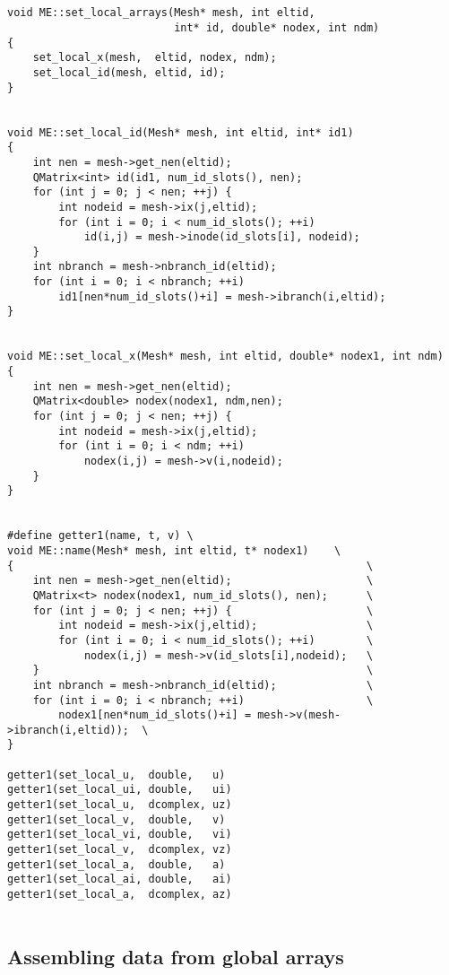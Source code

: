 \begin{verbatim}


void ME::set_local_arrays(Mesh* mesh, int eltid,
                          int* id, double* nodex, int ndm)
{
    set_local_x(mesh,  eltid, nodex, ndm);
    set_local_id(mesh, eltid, id);
}


void ME::set_local_id(Mesh* mesh, int eltid, int* id1)
{
    int nen = mesh->get_nen(eltid);
    QMatrix<int> id(id1, num_id_slots(), nen);
    for (int j = 0; j < nen; ++j) {
        int nodeid = mesh->ix(j,eltid);
        for (int i = 0; i < num_id_slots(); ++i)
            id(i,j) = mesh->inode(id_slots[i], nodeid);
    }
    int nbranch = mesh->nbranch_id(eltid);
    for (int i = 0; i < nbranch; ++i)
        id1[nen*num_id_slots()+i] = mesh->ibranch(i,eltid);
}


void ME::set_local_x(Mesh* mesh, int eltid, double* nodex1, int ndm)
{
    int nen = mesh->get_nen(eltid);
    QMatrix<double> nodex(nodex1, ndm,nen);
    for (int j = 0; j < nen; ++j) {
        int nodeid = mesh->ix(j,eltid);
        for (int i = 0; i < ndm; ++i)
            nodex(i,j) = mesh->v(i,nodeid);
    }
}


#define getter1(name, t, v) \
void ME::name(Mesh* mesh, int eltid, t* nodex1)    \
{                                                       \
    int nen = mesh->get_nen(eltid);                     \
    QMatrix<t> nodex(nodex1, num_id_slots(), nen);      \
    for (int j = 0; j < nen; ++j) {                     \
        int nodeid = mesh->ix(j,eltid);                 \
        for (int i = 0; i < num_id_slots(); ++i)        \
            nodex(i,j) = mesh->v(id_slots[i],nodeid);   \
    }                                                   \
    int nbranch = mesh->nbranch_id(eltid);              \
    for (int i = 0; i < nbranch; ++i)                   \
        nodex1[nen*num_id_slots()+i] = mesh->v(mesh->ibranch(i,eltid));  \
}

getter1(set_local_u,  double,   u)
getter1(set_local_ui, double,   ui)
getter1(set_local_u,  dcomplex, uz)
getter1(set_local_v,  double,   v)
getter1(set_local_vi, double,   vi)
getter1(set_local_v,  dcomplex, vz)
getter1(set_local_a,  double,   a)
getter1(set_local_ai, double,   ai)
getter1(set_local_a,  dcomplex, az)


\end{verbatim}
\subsection{Assembling data from global arrays}

